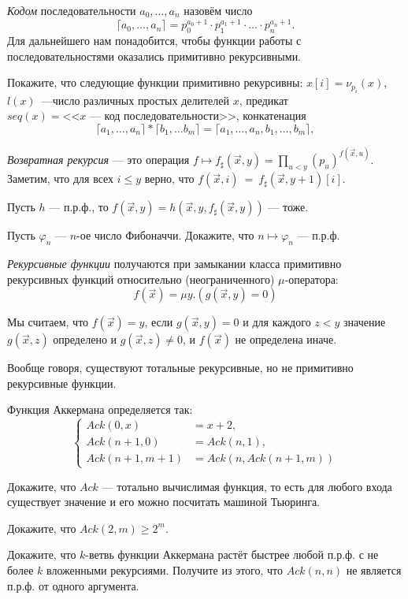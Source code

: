 \documentclass[a4paper, 12pt, num=Г1]{listok}
\renewcommand{\phi}{\varphi}
\begin{document}
\begin{definition}
	\textit{Кодом} последовательности $a_0, \dots, a_n$ назовём число
	\[
		\lceil a_0, \dots, a_n \rceil = p_0^{a_0 + 1} \cdot p_1^{a_1+1} \cdot \ldots \cdot p_n^{a_n+1}.
	\]
	Для дальнейшего нам понадобится, чтобы функции работы с последовательностями оказались примитивно рекурсивными.
\end{definition}
\begin{problem}\label{seq}
	Покажите, что следующие функции примитивно рекурсивны: $x[i] = \nu_{p_i}(x)$, $l(x)$~---число
	различных простых делителей $x$, предикат $seq(x) = \text{<<$x$ --- код последовательности>>}$, конкатенация
	\[
		\lceil a_1, \dots, a_n \rceil * \lceil b_1, \dots b_m \rceil = \lceil a_1, \dots, a_n, b_1, \dots, b_m \rceil,
	\]
\end{problem}
\begin{definition}
	\textit{Возвратная рекурсия} --- это операция $f \mapsto f_\sharp (\vec x, y) = \prod_{u < y} {(p_u)}^{f(\vec x, u)}$.
	Заметим, что для всех $i \le y$ верно, что $f(\vec x, i)~=~f_\sharp(\vec x, y + 1)[i]$.
\end{definition}
\begin{problem}
	Пусть $h$ --- п.р.ф., то $f(\vec x, y) = h(\vec x, y, f_\sharp(\vec x, y))$ --- тоже.
\end{problem}
\begin{problem}
	Пусть $\phi_n$ --- $n$-ое число Фибоначчи.
	Докажите, что $n \mapsto \phi_n$ --- п.р.ф.
\end{problem}
\begin{definition}
	\textit{Рекурсивные функции}  получаются при замыкании класса примитивно рекурсивных
	функций относительно (неограниченного) $\mu$-оператора:
	\[
		f (\vec x) = \mu y.(g(\vec x, y) = 0)
	\]

	Мы считаем, что $f (\vec x) = y$, если $g(\vec x, y) = 0$ и для каждого $z < y$ значение $g(\vec x, z)$
	определено и $g(\vec x, z) \ne 0$, и $f (\vec x)$ не определена иначе.
\end{definition}
Вообще говоря, существуют тотальные рекурсивные, но не примитивно рекурсивные функции.
\begin{definition}
	Функция Аккермана определяется так:
	\[
	\left \{
	\begin{aligned}
		Ack(0, x) &= x + 2,\\
		Ack(n + 1, 0) &= Ack(n, 1), \\
		Ack(n + 1, m + 1) &= Ack(n, Ack(n + 1, m))
	\end{aligned}
	\right .
	\]
\end{definition}
\begin{problem}
	Докажите, что $Ack$ --- тотально вычислимая функция, то есть для любого входа существует значение и его можно посчитать машиной Тьюринга.
\end{problem}
\begin{problem}
	Докажите, что $Ack(2, m) \ge 2^m$.
\end{problem}
\begin{problem}[${}^\star$]
	Докажите, что $k$-ветвь функции Аккермана растёт быстрее любой п.р.ф. с не более $k$ вложенными рекурсиями.
	Получите из этого, что $Ack(n, n)$ не является п.р.ф. от одного аргумента.
\end{problem}
\end{document}
